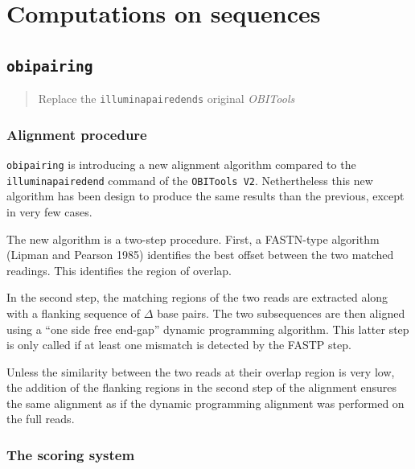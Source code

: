 \documentclass[
  letterpaper,
  DIV=11,
  numbers=noendperiod]{scrreprt}
\begin{document}
\hypertarget{computations-on-sequences}{%
\chapter{Computations on sequences}\label{computations-on-sequences}}

\hypertarget{obipairing}{%
\section{\texorpdfstring{\texttt{obipairing}}{obipairing}}\label{obipairing}}

\begin{quote}
Replace the \texttt{illuminapairedends} original \emph{OBITools}
\end{quote}

\hypertarget{alignment-procedure}{%
\subsection*{Alignment procedure}\label{alignment-procedure}}

\texttt{obipairing} is introducing a new alignment algorithm compared to
the \texttt{illuminapairedend} command of the \texttt{OBITools\ V2}.
Nethertheless this new algorithm has been design to produce the same
results than the previous, except in very few cases.

The new algorithm is a two-step procedure. First, a FASTN-type algorithm
(Lipman and Pearson 1985) identifies the best offset between the two
matched readings. This identifies the region of overlap.

In the second step, the matching regions of the two reads are extracted
along with a flanking sequence of \(\Delta\) base pairs. The two
subsequences are then aligned using a ``one side free end-gap'' dynamic
programming algorithm. This latter step is only called if at least one
mismatch is detected by the FASTP step.

Unless the similarity between the two reads at their overlap region is
very low, the addition of the flanking regions in the second step of the
alignment ensures the same alignment as if the dynamic programming
alignment was performed on the full reads.

\hypertarget{the-scoring-system}{%
\subsection*{The scoring system}\label{the-scoring-system}}
\end{document}
